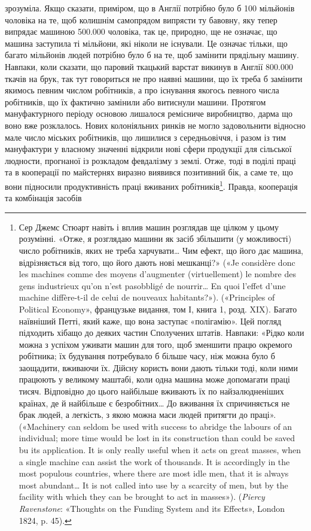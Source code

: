 \parcont{}  %
зрозуміла. Якщо сказати, приміром, що в Англії потрібно було б
100 мільйонів чоловіка на те, щоб колишнім самопрядом випрясти
ту бавовну, яку тепер випрядає машиною \num{500.000} чоловіка, так це,
природно, ще не означає, що машина заступила ті мільйони, які
ніколи не існували. Це означає тільки, що багато мільйонів
людей потрібно було б на те, щоб замінити прядільну машину.
Навпаки, коли сказати, що паровий ткацький варстат викинув
в Англії \num{800.000} ткачів на брук, так тут говориться не про наявні
машини, що їх треба б замінити якимось певним числом робітників,
а про існування якогось певного числа робітників, що їх
фактично замінили або витиснули машини. Протягом мануфактурного
періоду основою лишалося ремісниче виробництво, дарма
що воно вже розклалось. Нових колоніяльних ринків не могло
задовольнити відносно мале число міських робітників, що лишилися
з середньовіччя, і разом із тим мануфактури у власному
значенні відкрили нові сфери продукції для сільської людности,
прогнаної із розкладом февдалізму з землі. Отже, тоді в поділі
праці та в кооперації по майстернях виразно виявився позитивний
бік, а саме те, що вони підносили продуктивність праці вживаних
робітників\footnote{
Сер Джемс Стюарт навіть і вплив машин розглядав ще цілком у
цьому розумінні. «Отже, я розглядаю машини як засіб збільшити (у можливості)
число робітників, яких не треба харчувати\dots{} Чим ефект, що його
дає машина, відрізняється від того, що його дають нові мешканці?»
(«Je considère donc les machines comme des moyens d’augmenter (virtuellement)
le nombre des gens industrieux qu’on n’est pasobbligé de nourrir\dots{}
En quoi l’effet d’une machine diffère-t-il de celui de nouveaux habitants?»).
(«Principles of Political Economy», французьке видання, том І, книга 1,
розд. XIX). Багато наївніший Петті, який каже, що вона заступає «полігамію».
Цей погляд підходить хібащо до деяких частин Сполучених штатів.
Навпаки: «Рідко коли можна з успіхом уживати машин для того, щоб
зменшити працю окремого робітника; їх будування потребувало б більше
часу, ніж можна було б заощадити, вживаючи їх. Дійсну користь вони
дають тільки тоді, коли ними працюють у великому маштабі, коли одна
машина може допомагати праці тисяч. Відповідно до цього найбільше
вживають їх по найзалюдненіших країнах, де й найбільше є безробітних\dots{}
До вживання їх спричиняється не брак людей, а легкість, з якою можна
маси людей притягти до праці». («Machinery can seldom be used with success
to abridge the labours of an individual; more time would be lost in its
construction than could be saved bu its application. It is only really useful
when it acts on great masses, when a single machine can assist the work
of thousands. It is accordingly in the most populous countries, where there
are most idle men, that it is always most abundant\dots{} It is not called into
use by a scarcity of men, but by the facility with which they can be
brought to act in masses»). (\emph{Piercy Ravenstone}: «Thoughts on the Funding
System and its Effects», London 1824, p. 45).
}. Правда, кооперація та комбінація засобів
